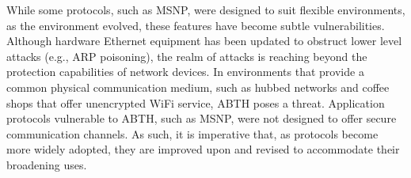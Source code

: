 \documentclass{sig-alternate}
\begin{document}
While some protocols, such as MSNP, were designed to suit flexible environments, as the environment evolved, these features have become subtle vulnerabilities.
Although hardware Ethernet equipment has been updated to obstruct lower level attacks (e.g., ARP poisoning), the realm of attacks is reaching beyond the protection capabilities of network devices.
In environments that provide a common physical communication medium, such as hubbed networks and coffee shops that offer unencrypted WiFi service, ABTH poses a threat.
Application protocols vulnerable to ABTH, such as MSNP, were not designed to offer secure communication channels.
As such, it is imperative that, as protocols become more widely adopted, they are improved upon and revised to accommodate their broadening uses.

\vfil\eject



\end{document}
